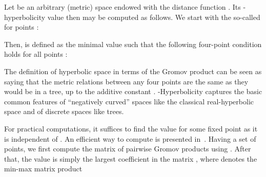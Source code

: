 \documentclass[10pt,twocolumn,letterpaper]{article}
\begin{document}
\begin{table}[htb!]
\caption{The relative delta  values calculated for different datasets. For image datasets we measured the Euclidean distance between the features produced by various standard feature extractors pretrained on ImageNet. Values of  closer to  indicate a stronger hyperbolicity of a dataset. Results are averaged across  subsamples of size . The standard deviation for all the experiments did not exceed .
}
\setlength{\tabcolsep}{4pt}
\label{tab:deltas_cv}
\vspace{-5mm}
\begin{center}
\end{center}
\vspace{-5mm}
\end{table}
 Let  be an arbitrary (metric) space endowed with the distance function . Its -hyperbolicity value then may be computed as follows. We start with the so-called  for points :

Then,  is defined as the minimal value such that the following four-point condition holds for all points :

The definition of hyperbolic space in terms of the Gromov product can be seen as saying that the metric relations between any four points are the same as they would be in a tree, up to the additive constant . -Hyperbolicity captures the basic common features of ``negatively curved'' spaces like the classical
real-hyperbolic space  and of discrete spaces like trees.

For practical computations, it suffices to find the  value for some fixed point  as it is independent of . An efficient way to compute  is presented in~\cite{fournier2015computing}. Having a set of points, we first compute the matrix  of pairwise Gromov products using . After that, the  value is simply the largest coefficient in the matrix , where  denotes the min-max matrix product 
\end{document}
